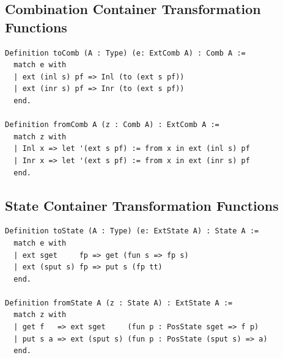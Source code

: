 \documentclass[a4paper, 11pt, fleqn, twoside, abstract=on]{scrreprt}
\begin{document}
\subsection{Combination Container Transformation Functions}
\label{ap:combc}
\begin{verbatim}
Definition toComb (A : Type) (e: ExtComb A) : Comb A :=
  match e with
  | ext (inl s) pf => Inl (to (ext s pf))
  | ext (inr s) pf => Inr (to (ext s pf))
  end.

Definition fromComb A (z : Comb A) : ExtComb A :=
  match z with
  | Inl x => let '(ext s pf) := from x in ext (inl s) pf
  | Inr x => let '(ext s pf) := from x in ext (inr s) pf
  end.
\end{verbatim}

\subsection{State Container Transformation Functions}
\label{ap:statec}
\begin{verbatim}
Definition toState (A : Type) (e: ExtState A) : State A :=
  match e with
  | ext sget     fp => get (fun s => fp s)
  | ext (sput s) fp => put s (fp tt)
  end.
  
Definition fromState A (z : State A) : ExtState A :=
  match z with
  | get f   => ext sget     (fun p : PosState sget => f p)
  | put s a => ext (sput s) (fun p : PosState (sput s) => a)
  end.
\end{verbatim}
\end{document}
